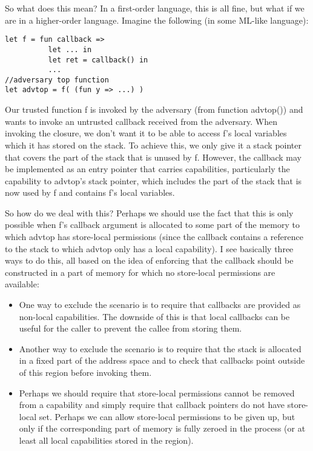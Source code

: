 \documentclass[a4paper]{article}
\begin{document}
So what does this mean? In a first-order language, this is all fine, but what if
we are in a higher-order language. Imagine the following (in some ML-like language):

\begin{verbatim}
let f = fun callback =>
          let ... in 
          let ret = callback() in
          ...
//adversary top function
let advtop = f( (fun y => ...) )
\end{verbatim}

Our trusted function f is invoked by the adversary (from function advtop()) and
wants to invoke an untrusted callback received from the adversary. When invoking
the closure, we don't want it to be able to access f's local variables which it
has stored on the stack. To achieve this, we only give it a stack pointer that
covers the part of the stack that is unused by f. However, the callback may be
implemented as an entry pointer that carries capabilities, particularly the
capability to advtop's stack pointer, which includes the part of the stack that
is now used by f and contains f's local variables.

So how do we deal with this? Perhaps we should use the fact that this is only
possible when f's callback argument is allocated to some part of the memory to
which advtop has store-local permissions (since the callback contains a
reference to the stack to which advtop only has a local capability). I see
basically three ways to do this, all based on the idea of enforcing that the
callback should be constructed in a part of memory for which no store-local
permissions are available:
\begin{itemize}
\item One way to exclude the scenario is to require that callbacks are provided
  as non-local capabilities. The downside of this is that local callbacks can be
  useful for the caller to prevent the callee from storing them.
\item Another way to exclude the scenario is to require that the stack is
  allocated in a fixed part of the address space and to check that callbacks
  point outside of this region before invoking them.
\item Perhaps we should require that store-local permissions cannot be removed
  from a capability and simply require that callback pointers do not have
  store-local set. Perhaps we can allow store-local permissions to be given up,
  but only if the corresponding part of memory is fully zeroed in the process
  (or at least all local capabilities stored in the region).
\end{itemize}
\end{document}
